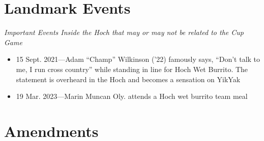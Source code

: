 \documentclass[12pt]{IEEEconf}
\begin{document}
\section{Landmark Events}
\textit{Important Events Inside the Hoch that may or may not be related to the Cup Game}

\begin{itemize}
    \item 15 Sept. 2021---Adam ``Champ'' Wilkinson ('22) famously says, ``Don't talk to me, I run cross country'' while standing in line for Hoch Wet Burrito. The statement is overheard in the Hoch and becomes a sensation on YikYak
    \item 19 Mar. 2023---Marin Muncan Oly. attends a Hoch wet burrito team meal
\end{itemize}
\section{Amendments}
\end{document}
